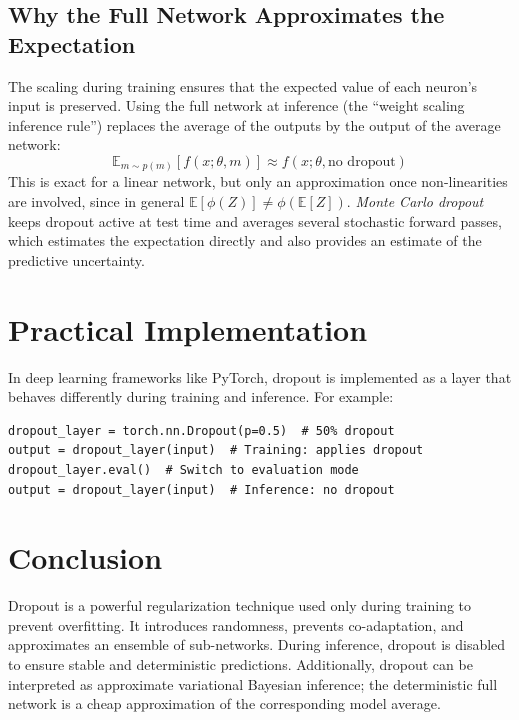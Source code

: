 \begin{notechapter}
\subsection{Why the Full Network Approximates the Expectation}
The scaling during training ensures that the expected value
of each neuron's input is preserved. Using the full network at
inference (the ``weight scaling inference rule'') replaces the
average of the outputs by the output of the average network:
\[
\mathbb{E}_{m \sim p(m)}[f(x; \theta, m)] \approx f(x; \theta, 
\text{no dropout})
\]
This is exact for a linear network, but only an approximation once
non-linearities are involved, since in general
\( \mathbb{E}[\phi(Z)] \neq \phi(\mathbb{E}[Z]) \). \emph{Monte Carlo dropout}
keeps dropout active at test time and averages several stochastic
forward passes, which estimates the expectation directly and also
provides an estimate of the predictive uncertainty.

\section{Practical Implementation}
In deep learning frameworks like PyTorch, dropout is 
implemented as a layer that behaves differently during 
training and inference. For example:
\begin{verbatim}
dropout_layer = torch.nn.Dropout(p=0.5)  # 50% dropout
output = dropout_layer(input)  # Training: applies dropout
dropout_layer.eval()  # Switch to evaluation mode
output = dropout_layer(input)  # Inference: no dropout
\end{verbatim}

\section{Conclusion}
Dropout is a powerful regularization technique used only 
during training to prevent overfitting. It introduces 
randomness, prevents co-adaptation, and approximates an 
ensemble of sub-networks. During inference, dropout is 
disabled to ensure stable and deterministic predictions. 
Additionally, dropout can be interpreted as approximate
variational Bayesian inference; the deterministic full network
is a cheap approximation of the corresponding model average.
\end{notechapter}
